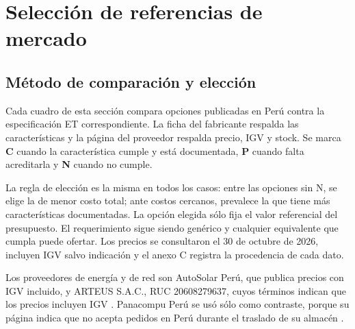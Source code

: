 \section{Selección de referencias de mercado}\label{sec:seleccion}
\subsection{Método de comparación y elección}
Cada cuadro de esta sección compara opciones publicadas en Perú contra la especificación ET correspondiente. La ficha del fabricante respalda las características y la página del proveedor respalda precio, IGV y stock. Se marca \textbf{C} cuando la característica cumple y está documentada, \textbf{P} cuando falta acreditarla y \textbf{N} cuando no cumple.

La regla de elección es la misma en todos los casos: entre las opciones sin N, se elige la de menor costo total; ante costos cercanos, prevalece la que tiene más características documentadas. La opción elegida sólo fija el valor referencial del presupuesto. El requerimiento sigue siendo genérico y cualquier equivalente que cumpla puede ofertar. Los precios se consultaron el 30 de octubre de 2026, incluyen IGV salvo indicación y el anexo C registra la procedencia de cada dato.

Los proveedores de energía y de red son AutoSolar Perú, que publica precios con IGV incluido, y ARTEUS S.A.C., RUC 20608279637, cuyos términos indican que los precios incluyen IGV \cite{arteus}. Panacompu Perú se usó sólo como contraste, porque su página indica que no acepta pedidos en Perú durante el traslado de su almacén \cite{panacompu}.

